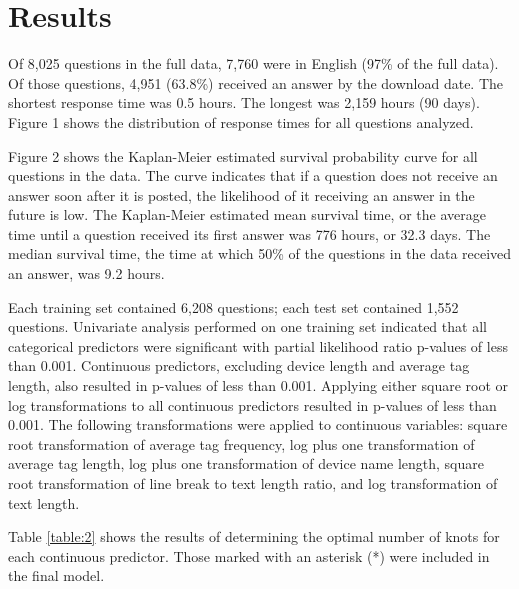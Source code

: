 \documentclass[]{interact}\usepackage[]{graphicx}\usepackage[]{color}
\begin{document}
\section{Results}



% 

  Of 8,025 questions in the full data, 7,760 were in English (97\% of the full data). Of those questions, 4,951 (63.8\%) received an answer by the download date. The shortest response time was 0.5 hours. The longest was 2,159 hours (90 days). Figure 1 shows the distribution of response times for all questions analyzed. 



Figure 2 shows the Kaplan-Meier estimated survival probability curve for all questions in the data. The curve indicates that if a question does not receive an answer soon after it is posted, the likelihood of it receiving an answer in the future is low. The Kaplan-Meier estimated mean survival time, or the average time until a question received its first answer was 776 hours, or 32.3 days. The median survival time, the time at which 50\% of the questions in the data received an answer, was 9.2 hours.




Each training set contained 6,208 questions; each test set contained 1,552 questions. Univariate analysis performed on one training set indicated that all categorical predictors were significant with partial likelihood ratio p-values of less than 0.001. Continuous predictors, excluding device length and average tag length, also resulted in p-values of less than 0.001. Applying either square root or log transformations to all continuous predictors resulted in p-values of less than 0.001. The following transformations were applied to continuous variables: square root transformation of average tag frequency, log plus one transformation of average tag length, log plus one transformation of device name length, square root transformation of line break to text length ratio, and log transformation of text length.

Table \ref{table:2} shows the results of determining the optimal number of knots for each continuous predictor. Those marked with an asterisk (*) were included in the final model. 
\end{document}
